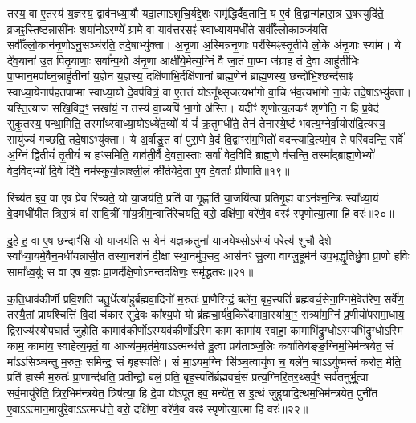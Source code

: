 तस्य॒ वा ए॒तस्य॑ य॒ज्ञस्य॒ द्वाव॑नध्या॒यौ यदा॒त्माऽशुचि॒र्यद्दे॒शः समृ॑द्धिर्दैव॒तानि॒ य ए॒वं वि॒द्वान्म॑हारा॒त्र उ॒षस्युदि॑ते॒ व्रज॒ꣴ॒स्तिष्ठ॒न्नासी॑नः॒ शया॑नो॒ऽरण्ये᳚ ग्रामे॒ वा याव॑त्त॒रसꣴ॑ स्वाध्या॒यमधी॑ते॒ सर्वाँ᳚ल्लो॒काञ्ज॑यति॒ सर्वाँ᳚ल्लो॒कान॑नृ॒णोऽनु॒\-सञ्च॑रति॒ तदे॒षाभ्यु॑क्ता। 
अ॒नृ॒णा अ॒स्मिन्न॑नृ॒णाः पर॑स्मिꣴ\-स्तृ॒तीये॑ लो॒के अ॑नृ॒णाः स्या॑म। 
ये दे॑व॒याना॑ उ॒त पि॑तृ॒याणाः॒ सर्वा᳚न्प॒थो अ॑नृ॒णा आक्षी॑ये॒मेत्य॒ग्निं वै जा॒तं पा॒प्मा ज॑ग्राह॒ तं दे॒वा आहु॑तीभिः पा॒प्मान॒मपा᳚घ्न॒न्नाहु॑तीनां य॒ज्ञेन॑ य॒ज्ञस्य॒ दक्षि॑णाभि॒र्दक्षि॑णानां ब्राह्म॒णेन॑ ब्राह्म॒णस्य॒ छन्दो॑भि॒श्छन्द॑साꣴ स्वाध्या॒येनाप॑हतपाप्मा स्वाध्या॒यो॑ दे॒वप॑वित्रं॒ वा ए॒तत्तं योऽनू᳚थ्सृ॒जत्यभा॑गो वा॒चि भ॑व॒त्यभा॑गो ना॒के तदे॒षाऽभ्यु॑क्ता। 
यस्ति॒त्याज॑ सखि॒विद॒ꣳ॒ सखा॑यं॒ न तस्य॑ वा॒च्यपि॑ भा॒गो अ॑स्ति। 
यदीꣳ॑ शृ॒णोत्य॒लकꣳ॑ शृणोति॒ न हि प्र॒वेद॑ सुकृ॒तस्य॒ पन्था॒मिति॒ तस्मा᳚थ्स्वाध्या॒योऽध्ये॑त॒व्यो॑ यं यं॑ क्र॒तुमधी॑ते॒ तेन॑ तेनास्ये॒ष्टं भ॑वत्य॒ग्नेर्वा॒योरा॑दि॒त्यस्य॒ सायु॑ज्यं गच्छति॒ तदे॒षाऽभ्यु॑क्ता। 
ये अ॒र्वाङु॒त वा॑ पुरा॒णे वे॒दं वि॒द्वाꣳस॑म॒भितो॑ वदन्त्यादि॒त्यमे॒व ते परि॑वदन्ति॒ सर्वे॑ अ॒ग्निं द्वि॒तीयं॑ तृ॒तीयं॑ च ह॒ꣳ॒समिति॒ याव॑ती॒र्वै दे॒वता॒स्ताः सर्वा॑ वेद॒विदि॑ ब्राह्म॒णे व॑सन्ति॒ तस्मा᳚द्ब्राह्म॒णेभ्यो॑ वेद॒विद्भ्यो॑ दि॒वे दि॑वे॒ नम॑स्कुर्या॒न्नाश्ली॒लं की᳚र्तयेदे॒ता ए॒व दे॒वताः᳚ प्रीणाति॥१९॥
\anuvakamend

रिच्य॑त इव॒ वा ए॒ष प्रेव रि॑च्यते॒ यो या॒जय॑ति॒ प्रति॑ वा गृ॒ह्णाति॑ या॒जयि॑त्वा प्रतिगृ॒ह्य वाऽन॑श्न॒न्त्रिः स्वा᳚ध्या॒यं वे॒दमधी॑यीत त्रिरा॒त्रं वा॑ सावि॒त्रीं गा॑य॒त्रीम॒न्वाति॑रेचयति॒ वरो॒ दक्षि॑णा॒ वरे॑णै॒व वरꣴ॑ स्पृणोत्या॒त्मा हि वरः॑॥२०॥
\anuvakamend

दु॒हे ह॒ वा ए॒ष छन्दाꣳ॑सि॒ यो या॒जय॑ति॒ स येन॑ यज्ञक्र॒तुना॑ या॒जये॒थ्सोऽर॑ण्यं प॒रेत्य॑ शुचौ दे॒शे स्वा᳚ध्या॒यमे॒वैन॒मधी॑यन्नासी॒त तस्या॒नश॑नं दी॒क्षा स्था॒नमु॑प॒सद॒ आस॑नꣳ सु॒त्या वाग्जु॒हूर्मन॑ उप॒भृद्धृ॒तिर्ध्रु॒वा प्रा॒णो ह॒विः सामा᳚ध्व॒र्युः स वा ए॒ष य॒ज्ञः प्रा॒णद॑क्षि॒णोऽन॑न्त\-दक्षिणः॒ समृ॑द्धतरः॥२१॥
\anuvakamend


क॒ति॒धाव॑कीर्णी प्रवि॒शति॑ चतु॒र्धेत्या॑हुर्ब्रह्मवा॒दिनो॑ म॒रुतः॑ प्रा॒णैरिन्द्रं॒ बले॑न॒ बृह॒स्पतिं॑ ब्रह्मवर्च॒सेना॒ग्निमे॒वेत॑रेण॒ सर्वे॑ण॒ तस्यै॒तां प्राय॑श्चित्तिं वि॒दां च॑कार सुदे॒वः का᳚श्य॒पो यो ब्र॑ह्मचा॒र्य॑व॒किरे॑दमावा॒स्या॑या॒ꣳ॒ रात्र्या॑म॒ग्निं प्र॒णीयो॑पसमा॒धाय॒ द्विराज्य॑स्योप॒घातं॑ जुहोति॒ कामाव॑कीर्णो॒ऽस्म्यव॑कीर्णोऽस्मि॒ काम॒ कामा॑य॒ स्वाहा॒ कामाभि॑द्रुग्धो॒ऽस्म्यभि॑द्रुग्धोऽस्मि॒ काम॒ कामा॑य॒ स्वाहेत्य॒मृतं॒ वा आज्य॑म॒मृत॑मे॒वाऽऽत्मन्ध॑त्ते हु॒त्वा प्रय॑ताञ्ज॒लिः कवा॑तिर्यङ्ङ॒ग्निम॒भि\-म॑न्त्रयेत॒ सं मा॑ऽऽसिञ्चन्तु म॒रुतः॒ समिन्द्रः॒ सं बृह॒स्पतिः॑। 
सं मा॒ऽयम॒ग्निः सि॑ञ्च॒त्वायु॑षा च॒ बले॑न॒ चाऽऽयु॑ष्मन्तं करोत॒ मेति॒ प्रति॑ हास्मै म॒रुतः॑ प्रा॒णान्द॑धति॒ प्रतीन्द्रो॒ बलं॒ प्रति॒ बृह॒स्पति॑र्ब्रह्मवर्च॒सं प्रत्य॒ग्निरि॒तर॒थ्सर्व॒ꣳ॒ सर्व॑तनुर्भू॒त्वा सर्व॒मायु॑रेति॒ त्रिर॒भिम॑न्त्रयेत॒ त्रिष॑त्या॒ हि दे॒वा योऽपू॑त इव॒ मन्ये॑त॒ स इ॒त्थं जु॑हुयादि॒त्थम॒भिम॑न्त्रयेत॒ पुनी॑त ए॒वाऽऽत्मान॒मायु॑रे॒वाऽऽत्मन्ध॑त्ते॒ वरो॒ दक्षि॑णा॒ वरे॑णै॒व वरꣴ॑ स्पृणोत्या॒त्मा हि वरः॑॥२२॥
\anuvakamend

